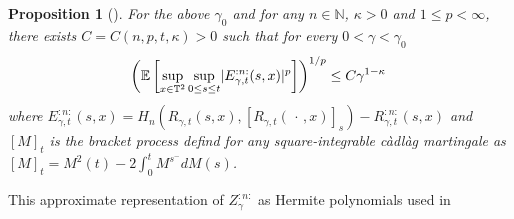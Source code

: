 \documentclass{report}
\newcommand{\NN}{\mathbb{N}}
\newcommand{\TT}{\mathbb{T}}
\DeclarePairedDelimiter\abs{\lvert}{\rvert} %
\newcommand{\Exp}[1]{\mathbb{E}\left[#1\right]}
\newcommand{\Placeholder}{\,\mathrel{\cdot}\,}
\newcommand{\Bracket}[1]{\left[#1\right]}
\newtheorem{proposition}[theorem]{Proposition}
\theoremstyle{remark}
\theoremstyle{definition}
\let\epsilon\varepsilon
\begin{document}
\begin{proposition}[{\cite[Proposition 5.3]{mourrat2015convergencetwodimensionaldynamicisingkac}}]
  For the above $\gamma_0$ and for any $n\in\NN$, $\kappa >0$ and $1 \le p < \infty$, there exists $C = C(n, p, t, \kappa) > 0$ such that for every $0 < \gamma < \gamma_0$\,
  \begin{align*}
    \left(\Exp{\sup_{x \in \TT^2} \sup_{0 \le s \le t} \abs{E^{:n:}_{\gamma, t}(s, x)}^p}\right)^{1/p} \le C \gamma^{1 - \kappa}\,
  \end{align*}
  where $E^{:n:}_{\gamma, t}(s, x) = H_n(R_{\gamma, t}(s, x), \Bracket{R_{\gamma, t}(\Placeholder, x)}_s) - R^{:n:}_{\gamma, t}(s, x)$ and $\Bracket{M}_t$ is the bracket process defind for any square-integrable càdlàg martingale as $\Bracket{M}_t = M^2(t) - 2 \int_{0}^{t}M^{s^{-}} dM(s)$.
\end{proposition}
This approximate representation of $Z_\gamma^{:n:}$ as Hermite polynomials used in 
\end{document}
